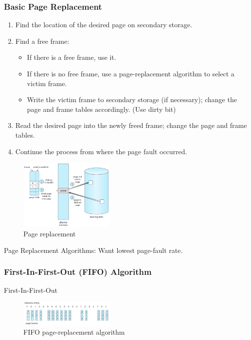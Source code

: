 \subsubsection{Basic Page Replacement}
\begin{enumerate}\small
    \item Find the location of the desired page on secondary
    storage.
    \item Find a free frame:
    \begin{itemize}\scriptsize
        \item If there is a free frame, use it.
        \item If there is no free frame, use a page-replacement
        algorithm to select a victim frame.
        \item Write the victim frame to secondary storage (if
        necessary); change the page and frame tables
        accordingly. (Use dirty bit)
    \end{itemize}
    \item Read the desired page into the newly freed frame;
    change the page and frame tables.
    \item Continue the process from where the page fault
    occurred.
\end{enumerate}

\begin{figure}[!htb]
    \centering
    \includegraphics[width=0.42\textwidth]{pic/OS9/Page replacement}
    \caption{Page replacement}
\end{figure}

Page Replacement Algorithms: Want lowest page-fault rate. 

\subsubsection{First-In-First-Out (FIFO) Algorithm}
First-In-First-Out
\begin{figure}[!htb]
    \centering
    \includegraphics[width=0.42\textwidth]{pic/OS9/FIFO page-replacement algorithm}
    \caption{FIFO page-replacement algorithm}
\end{figure}

